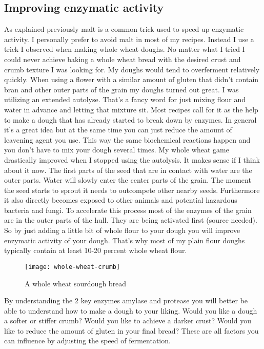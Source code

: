\subsection{Improving enzymatic activity}

As explained previously malt is a common trick used
to speed up enzymatic activity. I personally prefer
to avoid malt in most of my recipes. Instead I use
a trick I observed when making whole wheat doughs.
No matter what I tried I could never achieve baking
a whole wheat bread with the desired crust and crumb
texture I was looking for. My doughs would tend to
overferment relatively quickly. When using a flower
with a similar amount of gluten that didn't contain
bran and other outer parts of the grain my doughs turned
out great. I was utilizing an extended autolyse.
That's a fancy word for just mixing flour and water in
advance and letting that mixture sit. Most recipes
call for it as the help to make a dough that has already
started to break down by enzymes. In general it's a great
idea but at the same time you can just reduce the amount
of leavening agent you use. This way the same biochemical
reactions happen and you don't have to mix your dough
several times. My whole wheat game drastically improved
when I stopped using the autolysis. It makes sense if I
think about it now. The first parts of the seed that
are in contact with water are the outer parts. Water
will slowly enter the center parts of the grain. The
moment the seed starts to sprout it needs to outcompete
other nearby seeds. Furthermore it also directly becomes
exposed to other animals and potential hazardous bacteria
and fungi. To accelerate this process most of the enzymes
of the grain are in the outer parts of the hull. They
are being activated first (source needed). So by just
adding a little bit of whole flour to your dough you 
will improve enzymatic activity of your dough. That's
why most of my plain flour doughs typically contain
at least 10-20 percent whole wheat flour.

\begin{figure}
  \texttt{[image: whole-wheat-crumb]}
  \caption{A whole wheat sourdough bread}
  \label{whole-wheat-crumb}
\end{figure}


By understanding the 2 key enzymes amylase and protease
you will better be able to understand how to make a
dough to your liking. Would you like a dough a softer
or stiffer crumb? Would you like to achieve a darker crust?
Would you like to reduce the amount of gluten in your
final bread? These are all factors you can influence
by adjusting the speed of fermentation.

